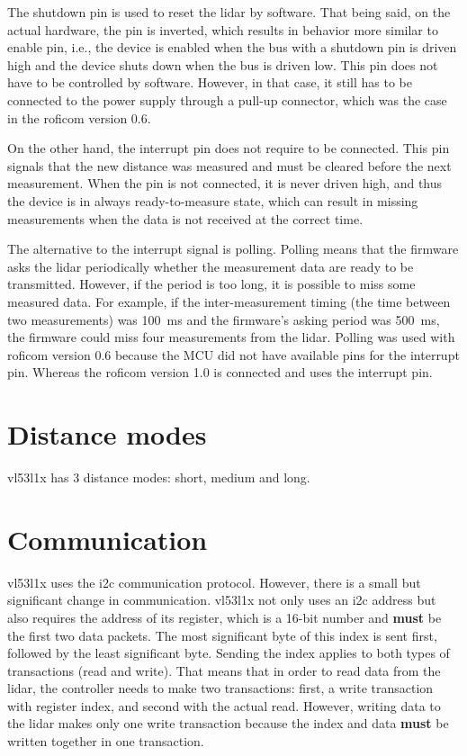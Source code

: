 \documentclass[
  digital,     %
  oneside,     %
  nosansbold,  %
  nocolorbold, %
  lof,         %
  lot,         %
]{fithesis4}
\begin{document}
The shutdown pin is used to reset the \acrshort{lidar} by software. That being said, on the actual hardware, the pin is inverted, which results in behavior more similar to enable pin, i.e., the device is enabled when the bus with a shutdown pin is driven high and the device shuts down when the bus is driven low. This pin does not have to be controlled by software. However, in that case, it still has to be connected to the power supply through a pull-up connector, which was the case in the \acrshort{roficom} version 0.6.

On the other hand, the interrupt pin does not require to be connected. This pin signals that the new distance was measured and must be cleared before the next measurement. When the pin is not connected, it is never driven high, and thus the device is in always ready-to-measure state, which can result in missing measurements when the data is not received at the correct time.

The alternative to the interrupt signal is polling. Polling means that the firmware asks the \acrshort{lidar} periodically whether the measurement data are ready to be transmitted. However, if the period is too long, it is possible to miss some measured data. For example, if the inter-measurement timing (the time between two measurements) was \qty{100}{\milli\second} and the firmware's asking period was \qty{500}{\milli\second}, the firmware could miss four measurements from the \acrshort{lidar}. Polling was used with \acrshort{roficom} version 0.6 because the MCU did not have available pins for the interrupt pin. Whereas the \acrshort{roficom} version 1.0 is connected and uses the interrupt pin.

\section{ Distance modes }
\gls{vl53l1x} has 3 distance modes: short, medium and long. 

\section{ Communication }
\gls{vl53l1x} uses the \acrshort{i2c} communication protocol. However, there is a small but significant change in communication. \gls{vl53l1x} not only uses an \acrshort{i2c} address but also requires the address of its register, which is a 16-bit number and \textbf{must} be the first two data packets. The most significant byte of this index is sent first, followed by the least significant byte. Sending the index applies to both types of transactions (read and write). That means that in order to read data from the \acrshort{lidar}, the controller needs to make two transactions: first, a write transaction with register index, and second with the actual read. However, writing data to the \acrshort{lidar} makes only one write transaction because the index and data \textbf{must} be written together in one transaction.
\end{document}
